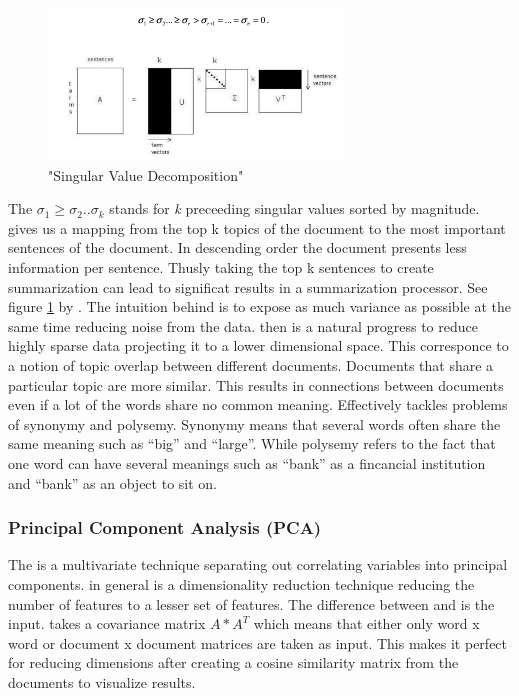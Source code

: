       \begin{figure}[h!]
        \centering
          \includegraphics[width=0.7\textwidth]{svd_lsa.png}
          \caption{"Singular Value Decomposition"}
          \label{svd_lsa}
      \end{figure}

      The $\sigma_1 \geq \sigma_2..\sigma_k$ stands for \emph{k} preceeding singular values sorted by magnitude. \lsa{} gives us a mapping from the top k topics of the document to the most important sentences of the document. In descending order the document presents less information per sentence. Thusly taking the top k sentences to create summarization can lead to significat results in a summarization processor. See figure \ref{svd_lsa} by \cite{SumLSASteinberger2004}.
      The intuition behind \svd{} is to expose as much variance as possible at the same time reducing noise from the data. \svd{} then is a natural progress to reduce highly sparse data projecting it to a lower dimensional space. This corresponce to a notion of topic overlap between different documents.
      Documents that share a particular topic are more similar. This results in connections between documents even if a lot of the words share no common meaning. Effectively \lsa{} tackles problems of synonymy and polysemy. Synonymy means that several words often share the same meaning such as ``big'' and ``large''. While polysemy refers to the fact that one word can have several meanings such as ``bank'' as a fincancial institution and ``bank'' as an object to sit on.

    \subsubsection{Principal Component Analysis (PCA)}
    \label{sec:pca}

    The \pcafull{} is a multivariate technique separating out correlating variables into principal components. \pca{} in general is a dimensionality reduction technique reducing the number of features to a lesser set of features. The difference between \pca{} and \lsa{} is the input. \pca{} takes a covariance matrix $A*A^{T}$ which means that either only word x word or document x document matrices are taken as input. This makes it perfect for reducing dimensions after creating a cosine similarity matrix from the documents to visualize results.

